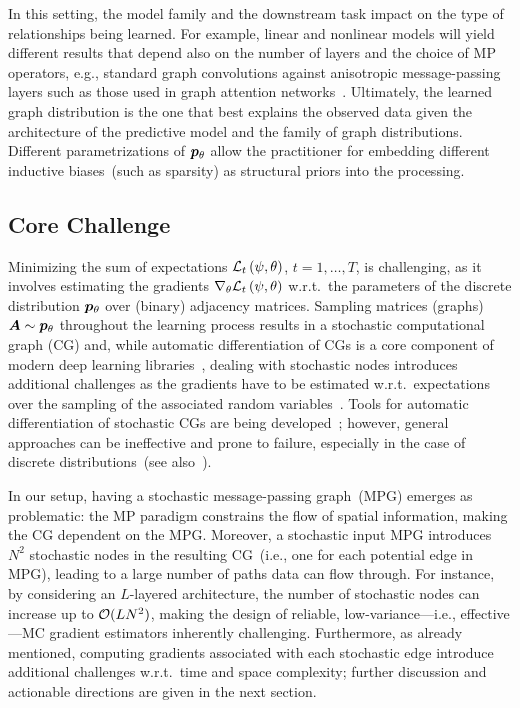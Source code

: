 In this setting, the model family and the downstream task impact on the type of relationships being learned. For example, linear and nonlinear models will yield different results that depend also on the number of layers and the choice of MP operators, e.g., standard graph convolutions against anisotropic message-passing layers such as those used in graph attention networks~\citep{velivckovic2018graph}. Ultimately, the learned graph distribution is the one that best explains the observed data given the architecture of the predictive model and the family of graph distributions. Different parametrizations of ${{\bm{p}}_\theta}$ allow the practitioner for embedding different inductive biases~(such as sparsity) as structural priors into the processing.


\subsection{Core Challenge}
Minimizing the sum of expectations $\mathcal{L}_t\left(\psi,\theta\right)$, $t=1,\dots,T$, is challenging, as it involves estimating the gradients $\nabla_\theta \mathcal{L}_t\left(\psi,\theta\right)$ w.r.t.\ the parameters of the discrete distribution ${{\bm{p}}_\theta}$ over (binary) adjacency matrices. Sampling matrices (graphs) ${\bm{A}}\sim {{\bm{p}}_\theta}$ throughout the learning process results in a stochastic computational graph (CG) and, while automatic differentiation of CGs is a core component of modern deep learning libraries~\citep{paske2019pytorch, abadi2015tensorflow}, dealing with stochastic nodes introduces additional challenges as the gradients have to be estimated w.r.t.\ expectations over the sampling of the associated random variables~\citep{schulman2015gradient, weber2019credit, mohamed2020monte}. Tools for automatic differentiation of stochastic CGs are being developed~\citep{foerster2018dice, bingham2019pyro, krieken2021storchastic, dillon2017tensorflow}; however, general approaches can be ineffective and prone to failure, especially in the case of discrete distributions~(see also~\citealt{mohamed2020monte}). 

In our setup, having a stochastic message-passing graph~(MPG) emerges as problematic: the MP paradigm constrains the flow of spatial information, making the CG dependent on the MPG.  Moreover, a stochastic input MPG introduces $N^2$ stochastic nodes in the resulting CG~(i.e., one for each potential edge in MPG), leading to a large number of paths data can flow through. For instance, by considering an $L$-layered architecture, the number of stochastic nodes can increase up to $\mathcal{O}(LN^2)$, making the design of reliable, low-variance---i.e., effective---MC gradient estimators inherently challenging. Furthermore, as already mentioned, computing gradients associated with each stochastic edge introduce additional challenges w.r.t.\ time and space complexity; further discussion and actionable directions are given in the next section.


